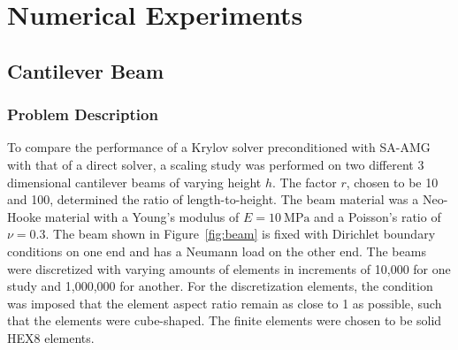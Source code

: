 \chapter{Numerical Experiments}
\label{chapter:NumericalExperiments}

\section{Cantilever Beam}
\subsection{Problem Description}


To compare the performance of a Krylov solver preconditioned with SA-AMG with that of a direct solver, a scaling study was performed on two different 3 dimensional cantilever beams of varying height $h$. The factor $r$, chosen to be 10 and 100, determined the ratio of length-to-height. The beam material was a Neo-Hooke material with a Young's modulus of $E = 10\ \text{MPa}$ and a Poisson's ratio of $\nu = 0.3$. The beam shown in Figure~\ref{fig:beam} is fixed with Dirichlet boundary conditions on one end and has a Neumann load on the other end. The beams were discretized with varying amounts of elements in increments of 10,000 for one study and 1,000,000 for another. For the discretization elements, the condition was imposed that the element aspect ratio remain as close to 1 as possible, such that the elements were cube-shaped. The finite elements were chosen to be solid HEX8 elements.

